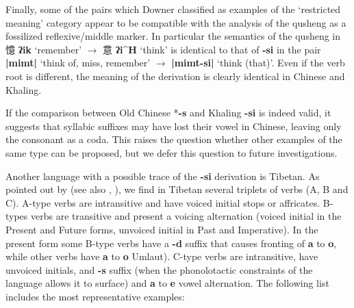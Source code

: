 \documentclass[oneside,a4paper,11pt]{article}
\newcommand{\ipa}[1]{{\phon\textbf{\mbox{#1}}}}
\newcommand{\zh}[1]{{\cn#1}}
\newcommand{\ch}[3]{\zh{#1} \ipa{#2} `#3'}
\begin{document}
Finally, some of the pairs which Downer classified as examples of the `restricted meaning' category appear to be compatible with the analysis of the qusheng as a fossilized reflexive/middle marker. In particular the semantics of the qusheng in \ch{憶}{ʔik}{remember} $\rightarrow$ \ch{意}{ʔi^H}{think} is identical to that of \ipa{-si} in the pair \ipa{|mimt|} `think of, miss, remember' $\rightarrow$ \ipa{|mimt-si|} `think (that)'. Even if the verb root is different, the meaning of the derivation is clearly identical in Chinese and Khaling.

If the comparison between Old Chinese *\ipa{-s} and Khaling \ipa{-si} is indeed valid, it suggests that syllabic suffixes may have lost their vowel in Chinese, leaving only the consonant as a coda. This raises the question whether other examples of the same type can be proposed, but we defer this question to future investigations.

Another language with a possible trace of the \ipa{-si} derivation is Tibetan. As pointed out by \citet{hill14voicing} (see also \citealt{uray53morphology}, \citealt[864]{zeisler04}), we find in Tibetan several triplets of verbs (A, B and C). A-type verbs are intransitive and have voiced initial stops or affricates. B-types verbs are transitive and present a voicing alternation (voiced initial in the Present and Future forms, unvoiced initial in Past and Imperative). In the present form some B-type verbs have a \ipa{-d} suffix that causes fronting of \ipa{a} to \ipa{o}, while other verbs have \ipa{a} to \ipa{o} Umlaut). C-type verbs are intransitive, have unvoiced initials, and \ipa{-s} suffix (when the phonolotactic constraints of the language allows it to surface) and \ipa{a} to \ipa{e} vowel alternation. The following list includes the most representative examples:
\end{document}
